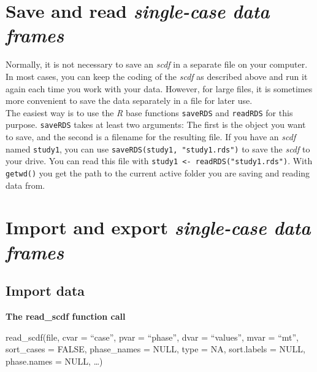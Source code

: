 \documentclass[
  letterpaper,
  DIV=11,
  numbers=noendperiod]{scrreprt}
\begin{document}
\hypertarget{save-and-read-single-case-data-frames}{%
\section{\texorpdfstring{Save and read \emph{single-case data
frames}}{Save and read single-case data frames}}\label{save-and-read-single-case-data-frames}}

Normally, it is not necessary to save an \emph{scdf} in a separate file
on your computer. In most cases, you can keep the coding of the
\emph{scdf} as described above and run it again each time you work with
your data. However, for large files, it is sometimes more convenient to
save the data separately in a file for later use.\\
The easiest way is to use the \emph{R} base functions \texttt{saveRDS}
and \texttt{readRDS} for this purpose. \texttt{saveRDS} takes at least
two arguments: The first is the object you want to save, and the second
is a filename for the resulting file. If you have an \emph{scdf} named
\texttt{study1}, you can use \texttt{saveRDS(study1,\ "study1.rds")} to
save the \emph{scdf} to your drive. You can read this file with
\texttt{study1\ \textless{}-\ readRDS("study1.rds")}. With
\texttt{getwd()} you get the path to the current active folder you are
saving and reading data from.

\hypertarget{import-and-export-single-case-data-frames}{%
\section{\texorpdfstring{Import and export \emph{single-case data
frames}}{Import and export single-case data frames}}\label{import-and-export-single-case-data-frames}}

\hypertarget{sec-read-scdf}{%
\subsection{Import data}\label{sec-read-scdf}}

\begin{tcolorbox}[enhanced jigsaw, breakable, rightrule=.15mm, bottomrule=.15mm, arc=.35mm, colback=white, colframe=quarto-callout-tip-color-frame, opacityback=0, leftrule=.75mm, toprule=.15mm, left=2mm]
\begin{minipage}[t]{5.5mm}
\textcolor{quarto-callout-tip-color}{\faLightbulb}
\end{minipage}%
\begin{minipage}[t]{\textwidth - 5.5mm}

\textbf{The read\_scdf function call}\vspace{2mm}

read\_scdf(file, cvar = ``case'', pvar = ``phase'', dvar = ``values'',
mvar = ``mt'', sort\_cases = FALSE, phase\_names = NULL, type = NA,
sort.labels = NULL, phase.names = NULL, \ldots)

\end{minipage}%
\end{tcolorbox}
\end{document}
